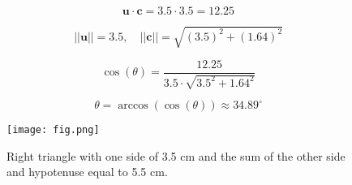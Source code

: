 \documentclass[journal]{IEEEtran}
\begin{document}
\[ 
\mathbf{u} \cdot \mathbf{c} = 3.5 \cdot 3.5 = 12.25 
\]

\[ 
||\mathbf{u}|| = 3.5, \quad ||\mathbf{c}|| = \sqrt{(3.5)^2 + (1.64)^2} 
\]

\[ 
\cos(\theta) = \frac{12.25}{3.5 \cdot \sqrt{3.5^2 + 1.64^2}} 
\]

\[ 
\theta = \arccos\left(\cos(\theta)\right) \approx 34.89^\circ 
\]

\begin{figure}[h!]
\centering
\texttt{[image: fig.png]} %
\caption{Right triangle with one side of 3.5 cm and the sum of the other side and hypotenuse equal to 5.5 cm.}
\end{figure}
\end{document}
